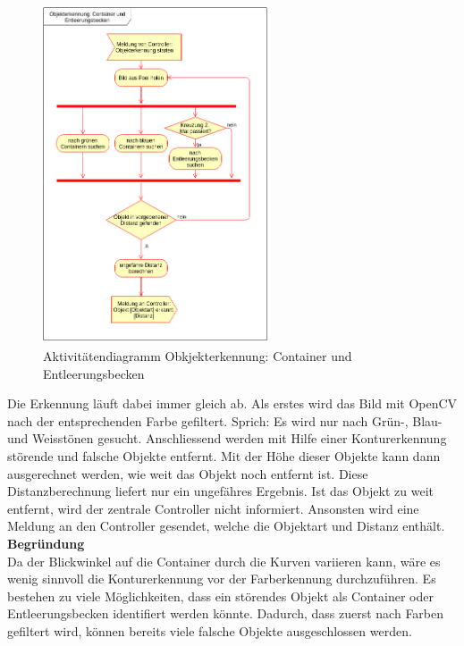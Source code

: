 \begin{figure}[H]%
\centering
\includegraphics[width=0.6\textwidth]{03_Loesungskonzept/pictures/objekterkennung_containers.png}
\caption{Aktivitätendiagramm Obkjekterkennung: Container und Entleerungsbecken}
\label{fig:activityContainer}
\end{figure}
\flushleft
Die Erkennung läuft dabei immer gleich ab. Als erstes wird das Bild mit OpenCV nach der entsprechenden Farbe gefiltert. Sprich: Es wird nur nach Grün-, Blau- und Weisstönen gesucht. Anschliessend werden mit Hilfe einer Konturerkennung störende und falsche Objekte entfernt. Mit der Höhe dieser Objekte kann dann ausgerechnet werden, wie weit das Objekt  noch entfernt ist. Diese Distanzberechnung liefert nur ein ungefähres Ergebnis. Ist das Objekt zu weit entfernt, wird der zentrale Controller nicht informiert. Ansonsten wird eine Meldung an den Controller gesendet, welche die Objektart und Distanz enthält.
\\[0.2cm]
\textbf{Begründung}\\[0.2cm]
Da der Blickwinkel auf die Container durch die Kurven variieren kann, wäre es wenig sinnvoll die Konturerkennung vor der Farberkennung durchzuführen. Es bestehen zu viele Möglichkeiten, dass ein störendes Objekt als Container oder Entleerungsbecken identifiert werden könnte. Dadurch, dass zuerst nach Farben gefiltert wird, können bereits viele falsche Objekte ausgeschlossen werden. \\
